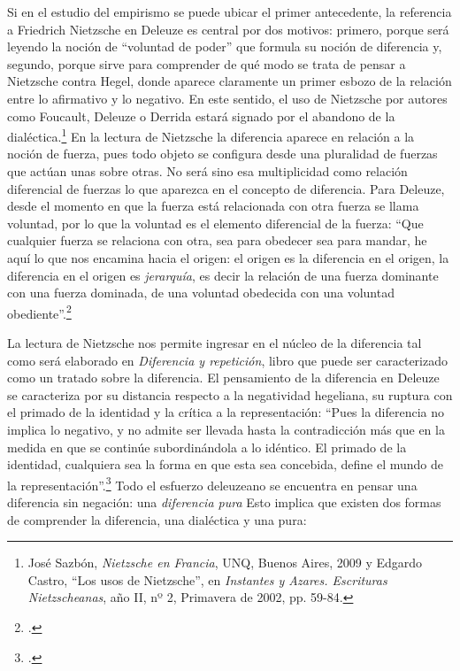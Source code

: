 Si en el estudio del empirismo se puede ubicar el primer antecedente, la
referencia a Friedrich Nietzsche en Deleuze es central por dos motivos:
primero, porque será leyendo la noción de \enquote{voluntad de poder} que
formula su noción de diferencia y, segundo, porque sirve para comprender
de qué modo se trata de pensar a Nietzsche contra Hegel, donde aparece
claramente un primer esbozo de la relación entre lo afirmativo y lo
negativo. En este sentido, el uso de Nietzsche por autores como
Foucault, Deleuze o Derrida estará signado por el abandono de la
dialéctica.\footnote{José Sazbón, \emph{Nietzsche en Francia}, UNQ,
  Buenos Aires, 2009 y Edgardo Castro, \enquote{Los usos de Nietzsche}, en
  \emph{Instantes y Azares. Escrituras Nietzscheanas}, año II, nº 2,
  Primavera de 2002, pp. 59-84.} En la lectura de Nietzsche la
diferencia aparece en relación a la noción de fuerza, pues todo objeto
se configura desde una pluralidad de fuerzas que actúan unas sobre
otras. No será sino esa multiplicidad como relación diferencial de
fuerzas lo que aparezca en el concepto de diferencia. Para Deleuze,
desde el momento en que la fuerza está relacionada con otra fuerza se
llama voluntad, por lo que la voluntad es el elemento diferencial de la
fuerza: \enquote{Que cualquier fuerza se relaciona con otra, sea para obedecer
sea para mandar, he aquí lo que nos encamina hacia el origen: el origen
es la diferencia en el origen, la diferencia en el origen es
\emph{jerarquía}, es decir la relación de una fuerza dominante con una
fuerza dominada, de una voluntad obedecida con una voluntad
obediente}.\footcites[16]{deleuze1998}[Indudablemente si en la noción de
  voluntad de poder se encuentra la genealogía de la diferencia
  deleuzeana, la repetición surge del eterno retorno: \enquote{(\dots) el
  eterno retorno se dice solamente del devenir, de lo múltiple. Es la
  ley de un mundo sin ser, sin unidad, sin identidad. Lejos de
  \emph{presuponer} lo Uno o lo Mismo, constituye la unidad exclusiva de
  lo múltiple en cuanto múltiple, la única identidad de lo que difiere:
  el volver es el único \enquote{ser} del devenir.}][163]{deleuze2005a}

La lectura de Nietzsche nos permite ingresar en el núcleo de la
diferencia tal como será elaborado en \emph{Diferencia y repetición},
libro que puede ser caracterizado como un tratado sobre la diferencia.
El pensamiento de la diferencia en Deleuze se caracteriza por su
distancia respecto a la negatividad hegeliana, su ruptura con el primado
de la identidad y la crítica a la representación: \enquote{Pues la diferencia no
implica lo negativo, y no admite ser llevada hasta la contradicción más
que en la medida en que se continúe subordinándola a lo idéntico. El
primado de la identidad, cualquiera sea la forma en que esta sea
concebida, define el mundo de la representación}.\footcite[15]{deleuze2005a} Todo el esfuerzo
deleuzeano se encuentra en pensar una diferencia sin negación: una
\emph{diferencia pura} Esto implica que existen dos formas de
comprender la diferencia, una dialéctica y una pura:


